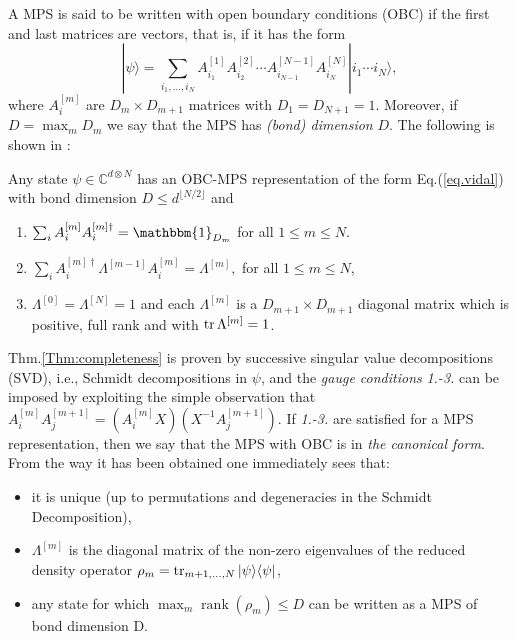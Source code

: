 \documentclass[aps,prl,epsfig,graphics,floatfix,mathbbm,a4paper]{article}
\newcommand{\1}{\mathbbm{1}}
\renewcommand{\>}{\rangle}
\newcommand{\<}{\langle}
\DeclareMathOperator{\rank}{rank}
\begin{document}
A MPS is said to be written with open boundary conditions (OBC) if
the first and last matrices are vectors, that is, if it has the
form
\begin{equation}\label{eq.vidal}
    |\psi\rangle=\sum_{i_1,\ldots,i_N}
    A^{[1]}_{i_1}A^{[2]}_{i_2}\cdots
    A^{[N-1]}_{i_{N-1}}A^{[N]}_{i_N}|i_1\cdots i_N\rangle,
\end{equation}
where $A^{[m]}_i$ are $D_{m}\times D_{m+1}$ matrices with
$D_1=D_{N+1}=1$. Moreover, if $D=\max_m D_m$ we say that the MPS
has {\it (bond) dimension} $D$. The following is shown in
\cite{Vi03}:
\begin{theorem}\label{thm:OBC-Vidal} Any
    state $\psi\in\mathbb{C}^{d\otimes N}$ has an OBC-MPS
    representation of the form Eq.(\ref{eq.vidal}) with bond dimension
    $D\leq d^{\lfloor N/2\rfloor}$ and
    \begin{enumerate}
        \item $\sum_i A^{[m]}_iA^{[m]\dagger}_i=\mathbbm {1}_{D_m}$ for
              all $1\le m\le N$. \item $\sum_i A^{[m]\dagger}_i\Lambda^{[m-1]}
                  A^{[m]}_i=\Lambda^{[m]}, $ for all $1\le m\le N$,  \item
              $\Lambda^{[0]}=\Lambda^{[N]}=1$ and each $\Lambda^{[m]}$ is a
              $D_{m+1}\times D_{m+1}$ diagonal matrix which is positive, full
              rank and with $\operatorname{tr}{\Lambda^{[m]}}=1$.
    \end{enumerate}\label{Thm:completeness}
\end{theorem}
Thm.\ref{Thm:completeness} is proven by successive singular value
decompositions (SVD), i.e., Schmidt decompositions in $\psi$, and
the \emph{gauge conditions} {\it 1.-3.} can be imposed by
exploiting the simple observation that
$A_i^{[m]}A_j^{[m+1]}=(A_i^{[m]}X) (X^{-1}A_j^{[m+1]})$. If {\it
        1.-3.} are satisfied for a MPS representation, then we say that
the MPS with OBC is in {\it the canonical form}. From the way it
has been obtained one immediately sees that:
\begin{itemize}
    \item  it is unique (up to permutations and degeneracies in the
          Schmidt Decomposition), \item $\Lambda^{[m]}$ is the diagonal
          matrix of the non-zero eigenvalues of the reduced density operator
          $\rho_m=\operatorname{tr}_{m+1,\ldots,N}|\psi\rangle\langle\psi|$, \item  any
          state for which $\max_m \rank(\rho_m)\le D$ can be written as a
          MPS of bond dimension D.
\end{itemize}
\end{document}
